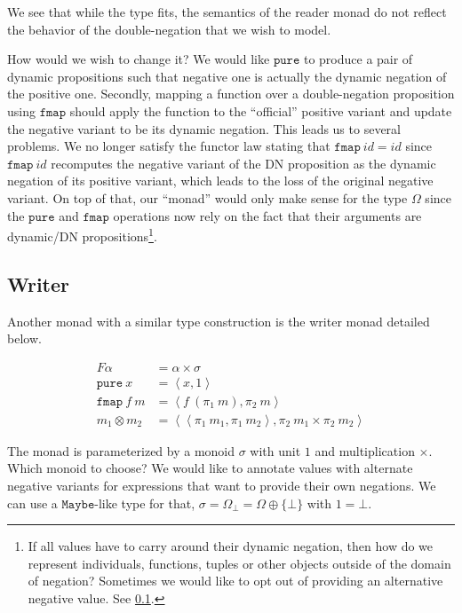 \documentclass[a4paper,11pt,DIV=12]{scrartcl}
\begin{document}
We see that while the type fits, the semantics of the reader monad do not
reflect the behavior of the double-negation that we wish to model.

How would we wish to change it? We would like $\texttt{pure}$ to produce a
pair of dynamic propositions such that negative one is actually the dynamic
negation of the positive one. Secondly, mapping a function over a
double-negation proposition using $\texttt{fmap}$ should apply the function
to the ``official'' positive variant and update the negative variant to be
its dynamic negation. This leads us to several problems. We no longer
satisfy the functor law stating that $\texttt{fmap}\ id = id$ since
$\texttt{fmap}\ id$ recomputes the negative variant of the DN proposition
as the dynamic negation of its positive variant, which leads to the loss of
the original negative variant. On top of that, our ``monad'' would only
make sense for the type $\Omega$ since the $\texttt{pure}$ and
$\texttt{fmap}$ operations now rely on the fact that their arguments are
dynamic/DN propositions\footnote{If all values have to carry around their
  dynamic negation, then how do we represent individuals, functions, tuples
  or other objects outside of the domain of negation? Sometimes we would
  like to opt out of providing an alternative negative value. See
  \ref{ssec:writer}.}.

\subsection{Writer}
\label{ssec:writer}

Another monad with a similar type construction is the writer monad detailed
below.

\begin{align*}
  F \alpha &= \alpha \times \sigma \\
  \texttt{pure}\ x &= \left<x, 1\right> \\
  \texttt{fmap}\ f\ m &= \left<f\ (\pi_1\ m), \pi_2\ m\right> \\
  m_1 \otimes m_2 &= \left<\left<\pi_1\ m_1, \pi_1\ m_2\right>, \pi_2\ m_1 \times \pi_2\ m_2\right>
\end{align*}

The monad is parameterized by a monoid $\sigma$ with unit $1$ and
multiplication $\times$. Which monoid to choose? We would like to annotate
values with alternate negative variants for expressions that want to
provide their own negations. We can use a $\texttt{Maybe}$-like type for
that, $\sigma = \Omega_{\bot} = \Omega \oplus \{\bot\}$ with $1 =
\bot$.
\end{document}
